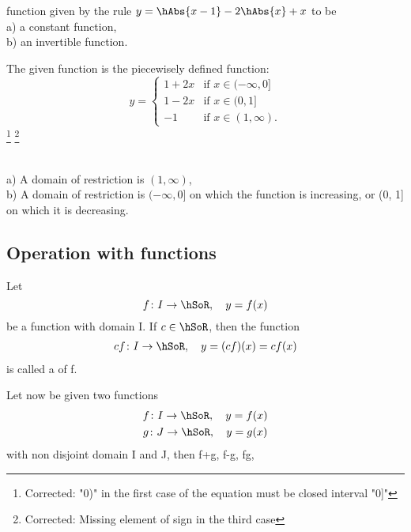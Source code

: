 \documentclass[11pt]{amsbook}
\begin{document}


function given by the rule $ y = \hAbs{x-1} - 2\hAbs{x}+ x $ to be \\
a) a constant function, \\
b) an invertible function.

\begin{hSolution}
	The given function is the piecewisely defined function:
	\[
		y = 
		\begin{cases}
			1+2x & \text{if }x \in(-\infty, 0] \\
			1-2x & \text{if }x \in(0, 1] \\
			-1 & \text{if }x \in(1, \infty).
		\end{cases}
	\]
\footnote{Corrected: "0)" in the first case of the equation must be closed interval "0]"}
\footnote{Corrected: Missing element of sign in the third case}
\end{hSolution}\\
a) A domain of restriction is $(1, \infty)$, \\
b) A domain of restriction is $(-\infty, 0]$ on which the function is increasing, or (0, 1] on which it is decreasing.

\subsection{Operation with functions}
Let
\[
	f\colon I \to \hSoR,\quad y = f(x)
\]
be a function with domain I. If $c \in \hSoR$, then the function
\begin{align}
	\label{eq:b1p1_053_scalarMultiple}
	cf\colon I \to \hSoR,\quad y = (cf)(x) = cf(x)
\end{align}
is called a  of f.

Let now be given two functions
\begin{gather*}
	f\colon I \to \hSoR,\quad y= f(x) \\
	g\colon J \to \hSoR,\quad y= g(x)
\end{gather*}
with non disjoint domain I and J, then f+g, f-g, fg,


\end{document}

